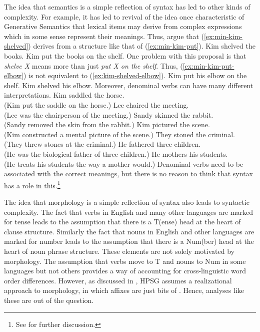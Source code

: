 \documentclass[output=paper]{langsci/langscibook}
\begin{document}
The idea that semantics is a simple reflection of syntax has led to other kinds of complexity. For example, it has led to revival of the idea once characteristic of Generative Semantics that lexical items may derive from complex expressions which in some sense represent their meanings. Thus, \citet{HK93a-u} argue that (\ref{ex:min-kim-shelved}) derives from a structure like that of (\ref{ex:min-kim-put}).
\eal
\ex Kim shelved the books.\label{ex:min-kim-shelved}
\ex Kim put the books on the shelf.\label{ex:min-kim-put}
\zl
One problem with this proposal is that \textit{shelve X} means more than just \textit{put X on the shelf}. Thus, (\ref{ex:min-kim-put-elbow}) is not equivalent to (\ref{ex:kim-shelved-elbow}).
\eal 
\ex Kim put his elbow on the shelf.\label{ex:min-kim-put-elbow}
\ex Kim shelved his elbow.\label{ex:kim-shelved-elbow}
\zl 
Moreover, denominal verbs can have many different interpretations.
\eal
\ex Kim saddled the horse.\\
(Kim put the saddle on the horse.)\label{ex:min-kim-saddled}
\ex Lee chaired the meeting.\\
(Lee was the chairperson of the meeting.)\label{ex:min-lee-chaired}
\ex Sandy skinned the rabbit.\\
(Sandy removed the skin from the rabbit.)\label{ex:min-sandy-skinned}
\ex Kim pictured the scene.\\
(Kim constructed a mental picture of the scene.)\label{ex:min-kim-pictured}
\ex They stoned the criminal.\\
(They threw stones at the criminal.)\label{ex:min-they-stoned}
\ex He fathered three children.\\
(He was the biological father of three children.)\label{ex:min-he-fathered}
\ex He mothers his students.\\
(He treats his students the way a mother would.)\label{ex:min-he-mothers}
\zl
Denominal verbs need to be associated with the correct meanings, but there is no reason to think that syntax has a role in this.\footnote{%
See \citet[53--56]{CJ2005a} for further discussion.%
}

The idea that morphology is a simple reflection of syntax also leads to syntactic complexity. The
fact that verbs in English and many other languages are marked for tense leads to the assumption
that there is a T(ense) head at the heart of clause structure. Similarly the fact that nouns in
English and other languages are marked for number leads to the assumption that there is a Num(ber)
head at the heart of noun phrase structure. These elements are not solely motivated by
morphology. The assumption that verbs move to T and nouns to Num in some languages but not others
provides a way of accounting for cross-linguistic word order differences. However, as discussed in , HPSG assumes a realizational approach to morphology, in which affixes are just bits of . Hence, analyses like these are out of the question.
\end{document}
